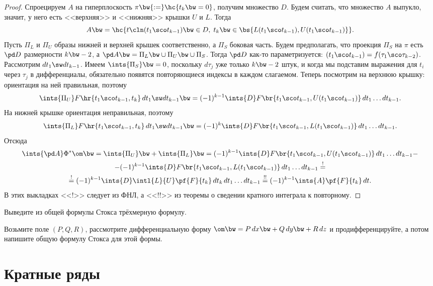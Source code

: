 \documentclass[a4paper]{article}
\begin{document}
\begin{proof}
Спроецируем $A$ на гиперплоскость $\pi \bw{:=} \hc{t_k \bw= 0}$, получим множество $D$. Будем считать,
что множество $A$ выпукло,
значит, у него есть <<верхняя>> и <<нижняя>> крышки $U$ и $L$. Тогда
$$A \bw= \hc{t\cln (t_1\sco t_{k-1}) \bw\in D,\; t_k \bw\in \bs{L(t_1\sco t_{k-1}), U(t_1\sco t_{k-1})}}.$$
Пусть $\Pi_L$ и $\Pi_U$ образы нижней и верхней крышек соответственно, а $\Pi_S$ боковая часть. Будем
предполагать, что проекция $\Pi_S$ на $\pi$ есть $\pd D$ размерности $k\bw-2$, а $\pd A \bw= \Pi_L \bw\cup
\Pi_U \bw\cup \Pi_S$. Тогда $\pd D$ как-то параметризуется: $(t_1\sco t_{k-1}) = f(\tau_1\sco \tau_{k-2})$.
Рассмотрим $d t_1\sw d t_{k-1}$. Имеем $\ints{\Pi_S} \bw= 0$, поскольку $d \tau_j$ уже только $k\bw-2$
штук, и когда мы подставим выражения для $t_i$ через $\tau_j$ в дифференциалы, обязательно появятся
повторяющиеся индексы в каждом слагаемом. Теперь посмотрим на верхнюю крышку: ориентация на ней правильная,
поэтому
$$\ints{\Pi_U}F\hr{t_1\sco t_{k-1}, t_k}\,d t_1\sw d t_{k-1} \bw=
(-1)^{k-1}\ints{D}F\br{t_1\sco t_{k-1}, U(t_1\sco t_{k-1})}\,d t_1\dots d t_{k-1}.$$ На нижней крышке
ориентация неправильная, поэтому
$$\ints{\Pi_L}F\hr{t_1\sco t_{k-1}, t_k}\,d t_1\sw d t_{k-1} \bw=
(-1)^k\ints{D}F\br{t_1\sco t_{k-1}, L(t_1\sco t_{k-1})}\,d t_1\dots d t_{k-1}.$$ Отсюда
\begin{multline*}
\ints{\pd A}\Phi^*\om \bw= \ints{\Pi_U} \bw+ \ints{\Pi_L} \bw=
(-1)^{k-1}\ints{D}F\br{t_1\sco t_{k-1}, U(t_1\sco t_{k-1})}\,d t_1\dots d t_{k-1} -\\
-(-1)^{k-1}\ints{D}F\br{t_1\sco t_{k-1}, L(t_1\sco t_{k-1})}\,d t_1\dots d t_{k-1}\stackrel{!}{=}\\
\stackrel{!}{=}(-1)^{k-1}\ints{D}\intl{L}{U} \pf{F}{t_k} \,d t_k \,d t_1\dots d t_{k-1} \stackrel{!!}{=}
(-1)^{k-1}\ints{A} \pf{F}{t_k} \,d t.
\end{multline*}
В этих выкладках <<!>> следует из ФНЛ, а <<!!>> из теоремы о сведении кратного интеграла к повторному.
\end{proof}

\begin{problem}
Выведите из общей формулы Стокса трёхмерную формулу.
\end{problem}
\begin{hint}
Возьмите поле $(P, Q, R)$,
рассмотрите дифференциальную форму $\om \bw= P\,d x \bw+ Q\,d y \bw+ R\,d z$ и продифференцируйте,
а потом напишите общую формулу Стокса для этой формы.
\end{hint}

\section{Кратные ряды}
\end{document}
